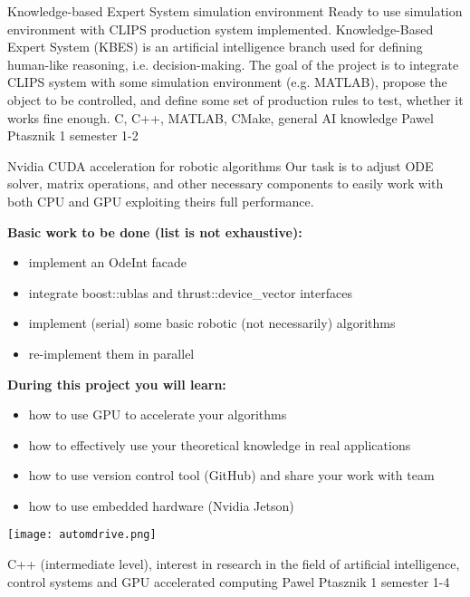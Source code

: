 \begin{project}
{Knowledge-based Expert System simulation environment}
{Ready to use simulation environment with CLIPS production system implemented.}
{
Knowledge-Based Expert System (KBES) is an artificial intelligence branch used for defining human-like reasoning, i.e. decision-making. The goal of the project is to integrate CLIPS system with some simulation environment (e.g. MATLAB), propose the object to be controlled, and define some set of production rules to test, whether it works fine enough. }
{C, C++, MATLAB, CMake, general AI knowledge}
{Pawel Ptasznik}
{1 semester}
{1-2}
\end{project}
\begin{project}
{Nvidia CUDA acceleration for robotic algorithms}
{Our task is to adjust ODE solver, matrix operations, and other necessary components to easily work with both CPU and GPU exploiting theirs full performance.}
{
\textbf{Basic work to be done (list is not exhaustive):}
\begin{itemize}
	\item implement an OdeInt facade
	\item integrate boost::ublas and thrust::device\_vector interfaces
	\item implement (serial) some basic robotic (not necessarily) algorithms
	\item re-implement them in parallel
\end{itemize}
\textbf{During this project you will learn:}
\begin{itemize}
	\item how to use GPU to accelerate your algorithms
	\item how to effectively use your theoretical knowledge in real applications
	\item how to use version control tool (GitHub) and share your work with team
	\item how to use embedded hardware (Nvidia Jetson)
\end{itemize}
\begin{center}\texttt{[image: automdrive.png]}\end{center}
}
{C++ (intermediate level), interest in research in the field of artificial intelligence, control systems and GPU accelerated computing}
{Pawel Ptasznik}
{1 semester}
{1-4}
\end{project}

